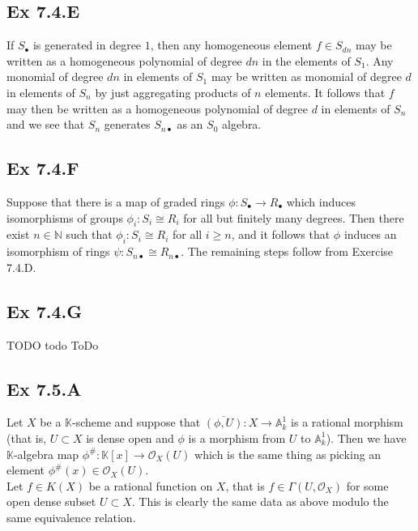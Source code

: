 \documentclass{article}
\theoremstyle{definition}
\newcommand{\K}{\mathbb{K}}
\newcommand{\N}{\mathbb{N}}
\newcommand{\A}{\mathbb{A}}
\begin{document}
\subsection*{Ex 7.4.E}

If $S_{\bullet}$ is generated in degree $1$, then any homogeneous element $f
	\in S_{dn}$ may be written as a homogeneous polynomial of degree $dn$ in the
elements of $S_{1}$. Any monomial of degree $dn$ in elements of $S_{1}$ may be
written as monomial of degree $d$ in elements of $S_{n}$ by just aggregating
products of $n$ elements. It follows that $f$ may then be written as a
homogeneous polynomial of degree $d$ in elements of $S_n$ and we see that $S_n$
generates $S_{n \bullet}$ as an $S_{0}$ algebra.

\subsection*{Ex 7.4.F}

Suppose that there is a map of graded rings $\phi : S_{\bullet} \to
	R_{\bullet}$ which induces isomorphisms of groups $\phi_i : S_i \cong R_i$ for
all but finitely many degrees. Then there exist $n \in \N$ such that $\phi_i :
	S_i \cong R_i$ for all $i \geq n$, and it follows that $\phi$ induces an
isomorphism of rings $\psi : S_{n \bullet} \cong R_{n \bullet}$. The remaining
steps follow from Exercise 7.4.D.

\subsection*{Ex 7.4.G}

TODO todo ToDo

\subsection*{Ex 7.5.A}

Let $X$ be a $\K$-scheme and suppose that $\overline{(\phi, U)} : X \to
	\A_{k}^{1}$ is a rational morphism (that is, $U \subset X$ is dense open and
$\phi$ is a morphism from $U$ to $\A_{k}^{1}$). Then we have $\K$-algebra map
$\phi^{\#} : \K[x] \to \mathcal{O}_X(U)$ which is the same thing as picking an
element $\phi^{\#}(x) \in \mathcal{O}_X(U)$. \\

Let $f \in K(X)$ be a rational function on $X$, that is $f \in \Gamma(U,
	\mathcal{O}_X)$ for some open dense subset $U \subset X$. This is clearly the
same data as above modulo the same equivalence relation.
\end{document}
